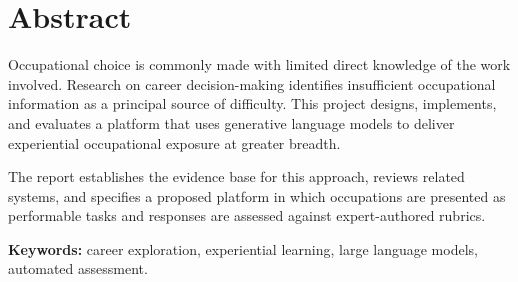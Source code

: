 \section*{Abstract}

Occupational choice is commonly made with limited direct knowledge of the work involved. Research on career decision-making identifies insufficient occupational information as a principal source of difficulty. This project designs, implements, and evaluates a platform that uses generative language models to deliver experiential occupational exposure at greater breadth.

The report establishes the evidence base for this approach, reviews related systems, and specifies a proposed platform in which occupations are presented as performable tasks and responses are assessed against expert-authored rubrics.

\textbf{Keywords:} career exploration, experiential learning, large language models, automated assessment.
